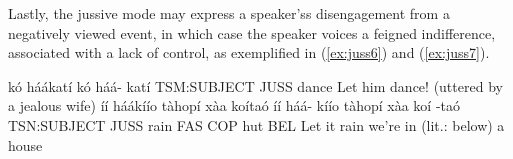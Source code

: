 \documentclass[a4paper, 12pt, oneside]{memoir}
\begin{document}
Lastly, the jussive mode may express a speaker'ss disengagement from a negatively viewed event, in which case the speaker voices a feigned indifference, associated with a lack of control, as exemplified in (\ref{ex:juss6}) and (\ref{ex:juss7}).
\begin{examples}
    \ex \label{ex:juss6}
    \words kó háákatí
    \bits kó háá- katí
    \gloss TSM:SUBJECT JUSS dance
    \tr Let him dance! (uttered by a jealous wife) 
    \ex \label{ex:juss7}
    \words íí háákíío tàhopí xàa koítaó
    \bits íí háá- kíío tàhopí xàa koí -taó 
    \gloss TSN:SUBJECT JUSS rain FAS COP hut BEL
    \tr Let it rain we're in (lit.: below) a house
\end{examples}
\begin{comment}
\subsection{Valency}\label{svvalency}
\subsubsection{Antipassive}
\subsubsection{Passive}
\subsubsection{Causative}
\subsection{Past tenses}\label{svpast}
\subsubsection{Recent Past}
\subsubsection{Distant Past}
\subsection{Person agreement}\label{svperson}
\subsection{Future tense}\label{svfut}
\section{Verb phrase structure}

\end{comment}
\end{document}
